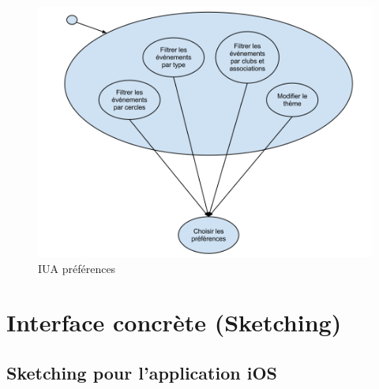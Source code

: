 \documentclass[a4paper, 11pt]{article}
\begin{document}
\begin{figure}[h!]
\centering
\includegraphics[width = 13cm]{IUApreferences.png}
	\caption{IUA préférences}
\end{figure}


\newpage

\section{Interface concrète (Sketching)}
\label{concrete}

\subsection{Sketching pour l'application iOS}
\label{sketchiOS}
\end{document}
